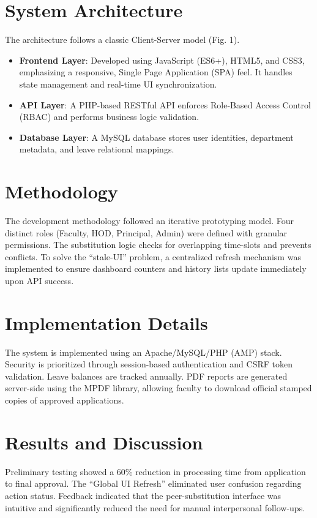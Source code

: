 \documentclass[conference]{IEEEtran}
\begin{document}
\section{System Architecture}
The architecture follows a classic Client-Server model (Fig. 1). 
\begin{itemize}
    \item \textbf{Frontend Layer}: Developed using JavaScript (ES6+), HTML5, and CSS3, emphasizing a responsive, Single Page Application (SPA) feel. It handles state management and real-time UI synchronization.
    \item \textbf{API Layer}: A PHP-based RESTful API enforces Role-Based Access Control (RBAC) and performs business logic validation.
    \item \textbf{Database Layer}: A MySQL database stores user identities, department metadata, and leave relational mappings.
\end{itemize}


\section{Methodology}
The development methodology followed an iterative prototyping model. Four distinct roles (Faculty, HOD, Principal, Admin) were defined with granular permissions. The substitution logic checks for overlapping time-slots and prevents conflicts. To solve the ``stale-UI'' problem, a centralized refresh mechanism was implemented to ensure dashboard counters and history lists update immediately upon API success.

\section{Implementation Details}
The system is implemented using an Apache/MySQL/PHP (AMP) stack. Security is prioritized through session-based authentication and CSRF token validation. Leave balances are tracked annually. PDF reports are generated server-side using the MPDF library, allowing faculty to download official stamped copies of approved applications.

\section{Results and Discussion}
Preliminary testing showed a 60\% reduction in processing time from application to final approval. The ``Global UI Refresh'' eliminated user confusion regarding action status. Feedback indicated that the peer-substitution interface was intuitive and significantly reduced the need for manual interpersonal follow-ups.
\end{document}
